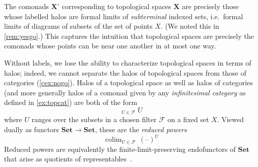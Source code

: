 \documentclass[11pt, oneside, article]{memoir}
\theoremstyle{plain}
\theoremstyle{definition}
\theoremstyle{remark}
\newenvironment{remark}
{\renewcommand\qedsymbol{$\lrcorner$}%
  \pushQED{\qed}\myremark}
{\popQED\endmyremark}
\DeclareMathOperator*{\colim}{colim}
\newcommand{\flim}{\mathop{\widetilde{\mathrm{lim}}}}
\DeclarePairedDelimiter{\abs}{\lvert}{\rvert}
\newcommand{\dash}{{\mathord{\text{--}}}}
\newcommand{\namedcat}[1]{\mathbf{#1}}
\newcommand{\spa}[1]{\mathbf{#1}}
\newcommand{\Halo}{\namedcat{Halo}}
\newcommand{\Set}{\namedcat{Set}}
\newcommand{\pts}[1]{{\abs{#1}}}
\newcommand{\xX}{X}
\newcommand{\xY}{Y}
\newcommand{\tX}{\spa{X}}
\newcommand{\tY}{\spa{Y}}
\newcommand{\cX}{\toptocmd{\tX}}
\newcommand{\toptocmd}[1]{{{#1}^\circ}}
\begin{document}
\begin{remark}[Topological spaces]
  The comonads $\cX$ corresponding to topological spaces $\tX$ are
  precisely those whose labelled halos are formal limits of
  \emph{subterminal} indexed sets, i.e.\ formal limits of diagrams of
  subsets of the set of points $X$. (We noted this in
  \cref{rem:yesgo}.) This captures the intuition that topological
  spaces are precisely the comonads whose points can be near one
  another in at most one way.

  Without labels, we lose the ability to characterize topological
  spaces in terms of halos; indeed, we cannot separate the halos of
  topological spaces from those of categories (\cref{cex:nogo}). Halos
  of a topological space as well as halos of categories (and more
  generally halos of a comonad given by any \emph{infinitesimal
    category} as defined in \cref{ex:topcat}) are both of the form
  \[\flim_{U \in \mathcal{F}} U\]
  where $U$ ranges over the subsets in a chosen filter $\mathcal{F}$
  on a fixed set $\xX$. Viewed dually as functors $\Set \to \Set$,
  these are the \emph{reduced powers}
  \[\colim_{U \in \mathcal{F}} \, (\dash)^U\]
  Reduced powers are equivalently the finite-limit-preserving
  endofunctors of $\Set$ that arise as quotients of
  representables~\cite[Theorem 1]{blass}.
\end{remark}
\end{document}
